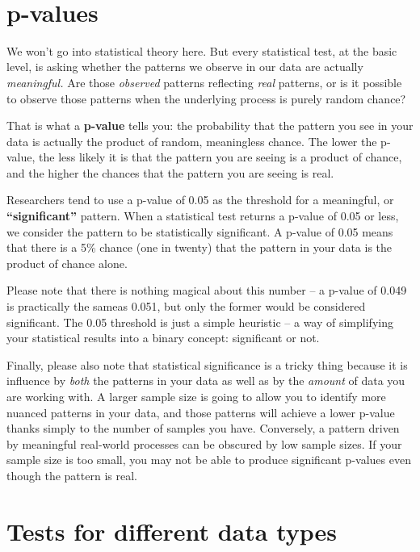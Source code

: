 \documentclass[
]{book}
\begin{document}
~

\hypertarget{p-values}{%
\section*{p-values}\label{p-values}}

We won't go into statistical theory here. But every statistical test, at the basic level, is asking whether the patterns we observe in our data are actually \emph{meaningful.} Are those \emph{observed} patterns reflecting \emph{real} patterns, or is it possible to observe those patterns when the underlying process is purely random chance?

That is what a \textbf{p-value} tells you: the probability that the pattern you see in your data is actually the product of random, meaningless chance. The lower the p-value, the less likely it is that the pattern you are seeing is a product of chance, and the higher the chances that the pattern you are seeing is real.

Researchers tend to use a p-value of 0.05 as the threshold for a meaningful, or \textbf{``significant''} pattern. When a statistical test returns a p-value of 0.05 or less, we consider the pattern to be statistically significant. A p-value of 0.05 means that there is a 5\% chance (one in twenty) that the pattern in your data is the product of chance alone.

Please note that there is nothing magical about this number -- a p-value of 0.049 is practically the sameas 0.051, but only the former would be considered significant. The 0.05 threshold is just a simple heuristic -- a way of simplifying your statistical results into a binary concept: significant or not.

Finally, please also note that statistical significance is a tricky thing because it is influence by \emph{both} the patterns in your data as well as by the \emph{amount} of data you are working with. A larger sample size is going to allow you to identify more nuanced patterns in your data, and those patterns will achieve a lower p-value thanks simply to the number of samples you have. Conversely, a pattern driven by meaningful real-world processes can be obscured by low sample sizes. If your sample size is too small, you may not be able to produce significant p-values even though the pattern is real.

\hypertarget{tests-for-different-data-types}{%
\section*{Tests for different data types}\label{tests-for-different-data-types}}
\end{document}

